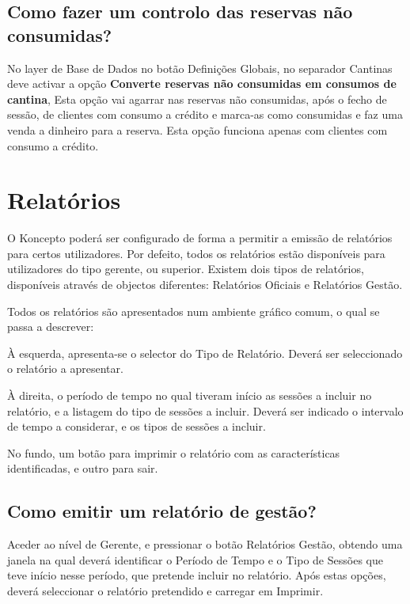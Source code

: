 \documentclass[a4paper,11pt,openany]{memoir}
\begin{document}
\section{Como fazer um controlo das reservas não consumidas?}
No layer de Base de Dados no botão Definições Globais, no separador Cantinas
deve activar a opção \textbf{Converte reservas não consumidas em consumos de cantina},
Esta opção vai agarrar nas reservas não consumidas, após o fecho de sessão, de
clientes com consumo a crédito e marca-as como consumidas e faz uma venda a
dinheiro para a reserva. Esta opção funciona apenas com clientes com consumo a
crédito.

\chapter{Relatórios}

O Koncepto poderá ser configurado de forma a permitir a emissão de relatórios para
certos utilizadores. Por defeito, todos os relatórios estão disponíveis para
utilizadores do tipo gerente, ou superior. Existem dois tipos de relatórios, disponíveis
através de objectos diferentes: Relatórios Oficiais e Relatórios Gestão.

Todos os relatórios são apresentados num ambiente gráfico comum, o qual se passa a
descrever:

À esquerda, apresenta-se o selector do Tipo de Relatório. Deverá ser seleccionado
o relatório a apresentar.

À direita, o período de tempo no qual tiveram início as sessões a incluir no relatório,
e a listagem do tipo de sessões a incluir. Deverá ser indicado o intervalo de tempo a
considerar, e os tipos de sessões a incluir.

No fundo, um botão para imprimir o relatório com as características identificadas, e
outro para sair.

\section{Como emitir um relatório de gestão?}
Aceder ao nível de Gerente, e pressionar o botão Relatórios Gestão, obtendo uma
janela na qual deverá identificar o Período de Tempo e o Tipo de Sessões que teve
início nesse período, que pretende incluir no relatório. Após estas opções, deverá
seleccionar o relatório pretendido e carregar em Imprimir.
\end{document}
